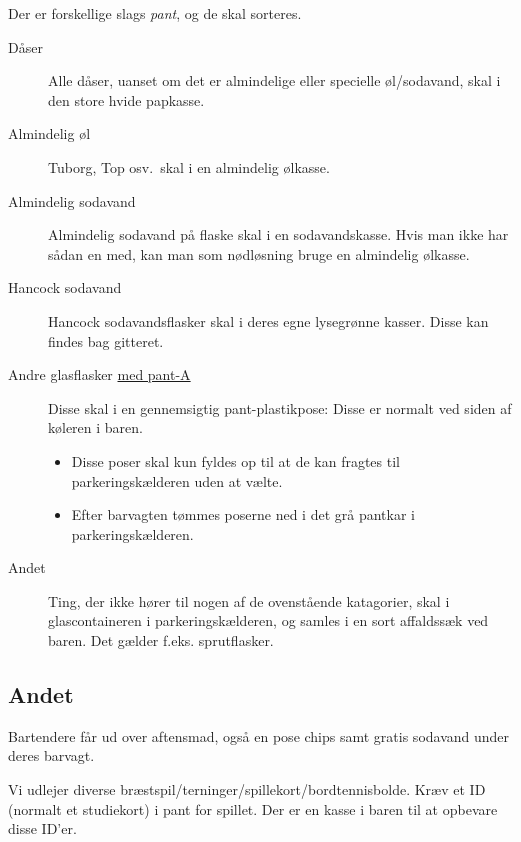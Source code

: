 Der er forskellige slags \textit{pant}, og de skal sorteres.
\begin{description}
\item[Dåser] Alle dåser, uanset om det er almindelige eller specielle
  øl/sodavand, skal i den store hvide papkasse.
\item[Almindelig øl] Tuborg, Top osv.\ skal i en almindelig ølkasse.
\item[Almindelig sodavand] Almindelig sodavand på flaske skal i en
  sodavandskasse. Hvis man ikke har sådan en med, kan man som
  nødløsning bruge en almindelig ølkasse.%
  \item[Hancock sodavand] Hancock sodavandsflasker skal i deres egne lysegrønne kasser. Disse kan findes bag gitteret.
\item[Andre glasflasker \underline{med pant-A}] Disse skal i en gennemsigtig
  pant-plastikpose: Disse er normalt ved siden af køleren i baren.
  \begin{itemize}
    \item Disse poser skal kun fyldes op til at de kan fragtes til parkeringskælderen uden at vælte.
    \item Efter barvagten tømmes poserne ned i det grå pantkar i parkeringskælderen.
  \end{itemize}
\item[Andet] Ting, der ikke hører til nogen af de ovenstående
  katagorier, skal i glascontaineren i parkeringskælderen, 
  og samles i en sort affaldssæk ved baren. Det gælder f.eks. sprutflasker.
\end{description}

\subsection{Andet}
\label{sec:intra:andet}

Bartendere får ud over aftensmad, også en pose chips samt gratis
sodavand under deres barvagt.

Vi udlejer diverse
bræstspil/terninger/spillekort/bordtennisbolde. Kræv et ID (normalt et
studiekort) i pant for spillet. Der er en kasse i baren til at
opbevare disse ID'er.

